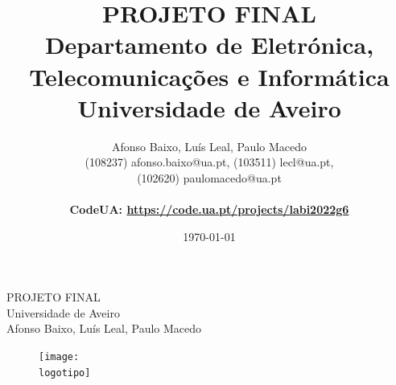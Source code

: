\documentclass{report}
\begin{document}
%
\def\titulo{PROJETO FINAL}
\def\data{\today}
\def\autores{Afonso Baixo, Luís Leal, Paulo Macedo}
\def\autorescontactos{(108237) afonso.baixo@ua.pt, (103511) lecl@ua.pt, \\(102620) paulomacedo@ua.pt}
\def\versao{VERSAO FINAL}
\def\departamento{Departamento de Eletrónica, Telecomunicações e Informática}
\def\empresa{Universidade de Aveiro}
\def\codeua{labi2022g6}
\def\logotipo{ua.pdf}
%
%
\begin{titlepage}

\begin{center}
%
\vspace{50mm}
%
{\Huge \titulo}\\ 
%
\vspace{10mm}
%
{\Large \empresa}\\
%
\vspace{10mm}
%
{\LARGE \autores}\\ 
%
\vspace{30mm}
%
\begin{figure}[h]
\center
\texttt{[image: \\logotipo]}
\end{figure}
%
\vspace{30mm}
\end{center}
%
\end{titlepage}

\title{%
{\Huge\textbf{\titulo}}\\
\vspace{10mm}
{\Large\departamento\\ \empresa}
}
%
\author{%
    \autores \\
    \autorescontactos \\
    \\
    \textbf{CodeUA: \url{https://code.ua.pt/projects/\codeua}}
}
%

\date{\data}
%
\maketitle

\end{document}
